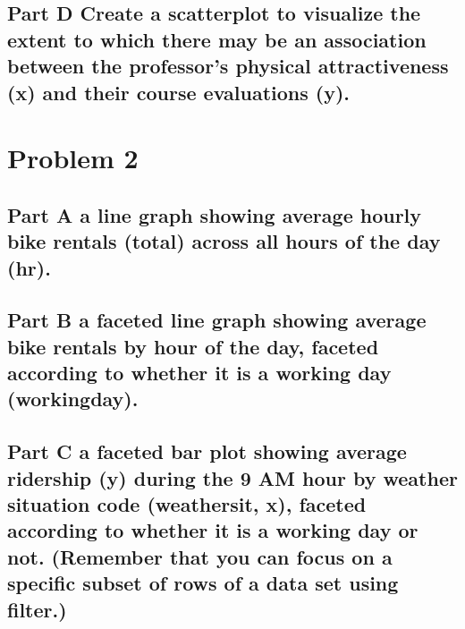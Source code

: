 \documentclass[
]{article}
\begin{document}
\hypertarget{part-d-create-a-scatterplot-to-visualize-the-extent-to-which-there-may-be-an-association-between-the-professors-physical-attractiveness-x-and-their-course-evaluations-y.}{%
\subsection{Part D Create a scatterplot to visualize the extent to which
there may be an association between the professor's physical
attractiveness (x) and their course evaluations
(y).}\label{part-d-create-a-scatterplot-to-visualize-the-extent-to-which-there-may-be-an-association-between-the-professors-physical-attractiveness-x-and-their-course-evaluations-y.}}

\hypertarget{problem-2}{%
\section{Problem 2}\label{problem-2}}

\hypertarget{part-a-a-line-graph-showing-average-hourly-bike-rentals-total-across-all-hours-of-the-day-hr.}{%
\subsection{Part A a line graph showing average hourly bike rentals
(total) across all hours of the day
(hr).}\label{part-a-a-line-graph-showing-average-hourly-bike-rentals-total-across-all-hours-of-the-day-hr.}}

\hypertarget{part-b-a-faceted-line-graph-showing-average-bike-rentals-by-hour-of-the-day-faceted-according-to-whether-it-is-a-working-day-workingday.}{%
\subsection{Part B a faceted line graph showing average bike rentals by
hour of the day, faceted according to whether it is a working day
(workingday).}\label{part-b-a-faceted-line-graph-showing-average-bike-rentals-by-hour-of-the-day-faceted-according-to-whether-it-is-a-working-day-workingday.}}

\hypertarget{part-c-a-faceted-bar-plot-showing-average-ridership-y-during-the-9-am-hour-by-weather-situation-code-weathersit-x-faceted-according-to-whether-it-is-a-working-day-or-not.-remember-that-you-can-focus-on-a-specific-subset-of-rows-of-a-data-set-using-filter.}{%
\subsection{Part C a faceted bar plot showing average ridership (y)
during the 9 AM hour by weather situation code (weathersit, x), faceted
according to whether it is a working day or not. (Remember that you can
focus on a specific subset of rows of a data set using
filter.)}\label{part-c-a-faceted-bar-plot-showing-average-ridership-y-during-the-9-am-hour-by-weather-situation-code-weathersit-x-faceted-according-to-whether-it-is-a-working-day-or-not.-remember-that-you-can-focus-on-a-specific-subset-of-rows-of-a-data-set-using-filter.}}
\end{document}
